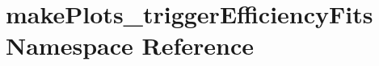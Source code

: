 \hypertarget{namespacemakePlots__triggerEfficiencyFits}{
\section{makePlots\_\-triggerEfficiencyFits Namespace Reference}
\label{namespacemakePlots__triggerEfficiencyFits}
}
